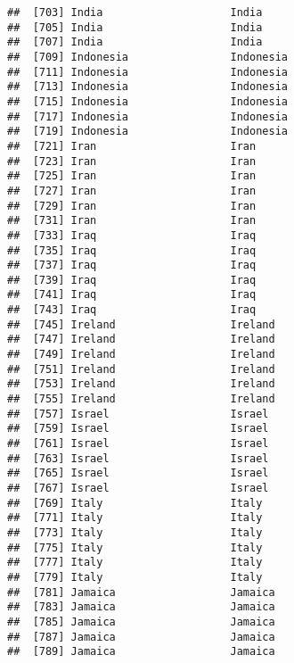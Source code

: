 \documentclass[]{article}
\begin{document}
\begin{verbatim}
##  [703] India                    India                   
##  [705] India                    India                   
##  [707] India                    India                   
##  [709] Indonesia                Indonesia               
##  [711] Indonesia                Indonesia               
##  [713] Indonesia                Indonesia               
##  [715] Indonesia                Indonesia               
##  [717] Indonesia                Indonesia               
##  [719] Indonesia                Indonesia               
##  [721] Iran                     Iran                    
##  [723] Iran                     Iran                    
##  [725] Iran                     Iran                    
##  [727] Iran                     Iran                    
##  [729] Iran                     Iran                    
##  [731] Iran                     Iran                    
##  [733] Iraq                     Iraq                    
##  [735] Iraq                     Iraq                    
##  [737] Iraq                     Iraq                    
##  [739] Iraq                     Iraq                    
##  [741] Iraq                     Iraq                    
##  [743] Iraq                     Iraq                    
##  [745] Ireland                  Ireland                 
##  [747] Ireland                  Ireland                 
##  [749] Ireland                  Ireland                 
##  [751] Ireland                  Ireland                 
##  [753] Ireland                  Ireland                 
##  [755] Ireland                  Ireland                 
##  [757] Israel                   Israel                  
##  [759] Israel                   Israel                  
##  [761] Israel                   Israel                  
##  [763] Israel                   Israel                  
##  [765] Israel                   Israel                  
##  [767] Israel                   Israel                  
##  [769] Italy                    Italy                   
##  [771] Italy                    Italy                   
##  [773] Italy                    Italy                   
##  [775] Italy                    Italy                   
##  [777] Italy                    Italy                   
##  [779] Italy                    Italy                   
##  [781] Jamaica                  Jamaica                 
##  [783] Jamaica                  Jamaica                 
##  [785] Jamaica                  Jamaica                 
##  [787] Jamaica                  Jamaica                 
##  [789] Jamaica                  Jamaica                 

\end{verbatim}
\end{document}
